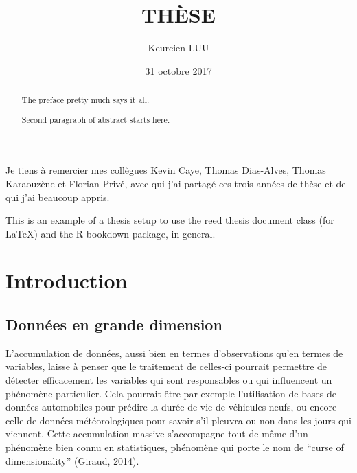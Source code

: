 \documentclass[12pt,twoside]{reedthesis}
\title{THÈSE}
\author{Keurcien LUU}
\date{31 octobre 2017}
\theoremstyle{definition}
\theoremstyle{definition}
\theoremstyle{remark}
\begin{document}
      \maketitle
  
  \frontmatter %
  \pagestyle{empty} %

      \begin{acknowledgements}
      Je tiens à remercier mes collègues Kevin Caye, Thomas Dias-Alves, Thomas
      Karaouzène et Florian Privé, avec qui j'ai partagé ces trois années de
      thèse et de qui j'ai beaucoup appris.
    \end{acknowledgements}
  
      \begin{preface}
      This is an example of a thesis setup to use the reed thesis document
      class (for LaTeX) and the R bookdown package, in general.
    \end{preface}
  
      \hypersetup{linkcolor=black}
    \setcounter{tocdepth}{2}
    \tableofcontents
  
      \listoftables
  
      \listoffigures
  
      \begin{abstract}
      The preface pretty much says it all. \par  Second paragraph of abstract
      starts here.
    \end{abstract}
  
  
  \mainmatter %
  \pagestyle{fancyplain} %

  \chapter*{Introduction}\label{introduction}
  
  \section{Données en grande dimension}\label{donnees-en-grande-dimension}
  
  L'accumulation de données, aussi bien en termes d'observations qu'en
  termes de variables, laisse à penser que le traitement de celles-ci
  pourrait permettre de détecter efficacement les variables qui sont
  responsables ou qui influencent un phénomène particulier. Cela pourrait
  être par exemple l'utilisation de bases de données automobiles pour
  prédire la durée de vie de véhicules neufs, ou encore celle de données
  météorologiques pour savoir s'il pleuvra ou non dans les jours qui
  viennent. Cette accumulation massive s'accompagne tout de même d'un
  phénomène bien connu en statistiques, phénomène qui porte le nom de
  ``curse of dimensionality'' (Giraud, 2014).
  
\end{document}
